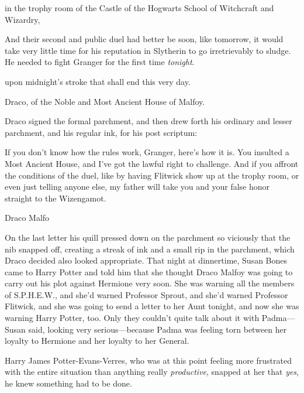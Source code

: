 \begin{writtenNote}
in the trophy room of the Castle of the Hogwarts School of Witchcraft and
Wizardry,
\end{writtenNote}

And their second and public duel had better be soon, like tomorrow, it would
take very little time for his reputation in Slytherin to go irretrievably to
sludge. He needed to fight Granger for the first time \emph{tonight}.

\begin{writtenNote}
upon midnight's stroke that shall end this very day.

Draco, of the Noble and Most Ancient House of Malfoy.
\end{writtenNote}

Draco signed the formal parchment, and then drew forth his ordinary and lesser
parchment, and his regular ink, for his post scriptum:

\begin{writtenNote}
If you don't know how the rules work, Granger, here's how it is. You
insulted a Most Ancient House, and I've got the lawful right to challenge. And
if you affront the conditions of the duel, like by having Flitwick show up at
the trophy room, or even just telling anyone else, my father will take you and
your false honor straight to the Wizengamot.

Draco Malfo
\end{writtenNote}

On the last letter his quill pressed down on the parchment so viciously that
the nib snapped off, creating a streak of ink and a small rip in the parchment,
which Draco decided also looked appropriate.
\sbreak
That night at dinnertime, Susan Bones came to Harry Potter and told him that
she thought Draco Malfoy was going to carry out his plot against Hermione very
soon. She was warning all the members of S.P.H.E.W., and she'd warned Professor
Sprout, and she'd warned Professor Flitwick, and she was going to send a letter
to her Aunt tonight, and now she was warning Harry Potter, too. Only they
couldn't quite talk about it with Padma---Susan said, looking very
serious---because Padma was feeling torn between her loyalty to Hermione and
her loyalty to her General.

Harry James Potter-Evans-Verres, who was at this point feeling more frustrated
with the entire situation than anything really \emph{productive}, snapped at
her that \emph{yes}, he knew something had to be done.

